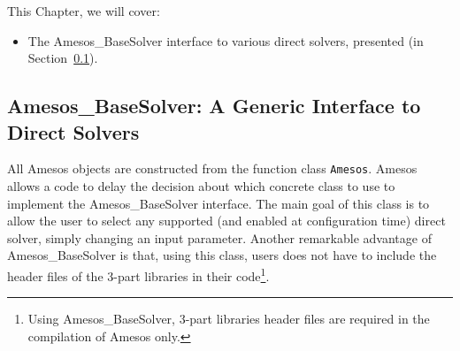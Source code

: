 This Chapter, we will cover:
\begin{itemize}
\item The Amesos\_BaseSolver interface to various direct solvers,
  presented (in Section~\ref{sec:amesos_generic}).
\end{itemize}


\subsection{Amesos\_BaseSolver: A Generic Interface to Direct Solvers}
\label{sec:amesos_generic}

All Amesos objects are constructed from the function class
\verb!Amesos!.  Amesos allows a code to delay the
decision about which concrete class to use to implement the
Amesos\_BaseSolver interface. The main goal of this class is to allow
the user to select any supported (and enabled at configuration time)
direct solver, simply changing an input parameter. Another remarkable
advantage of Amesos\_BaseSolver is that, using this class, users does
not have to include the header files of the 3-part libraries in their
code\footnote{Using Amesos\_BaseSolver, 3-part libraries header files
  are required in the compilation of Amesos only.}.

